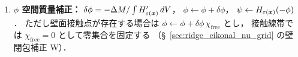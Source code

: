 \begin{tcolorbox}[algbox, title={Ridge--Eikonal 距離再構成の基本手順}]
\begin{enumerate}
        ここで $\varepsilon_\xi$ は §\ref{sec:cls_advection}
        の界面幅係数 $C_\varepsilon$ と同一のスカラー定数
        （$\varepsilon = C_\varepsilon\Delta x_{\min}$ より $\varepsilon_\xi = C_\varepsilon \approx 1.0\sim 2.0$）；
        本節では ξ 計算座標で $\varepsilon_\xi$ 表記を採用し，
        §\ref{sec:cls_advection}/§\ref{sec:intro} と表記体系のみ異なる
        同一物理量を表す．
        一様格子では $\varepsilon(i,j) = \varepsilon$（スカラーに帰着）；
        非一様格子では各セルの物理格子幅に比例した界面幅を実現する．
  \item \textbf{$\phi$ 空間質量補正：}
        $\delta\phi = -\Delta M / \int H'_{\varepsilon(\bm{x})}\,dV$，
        $\phi \leftarrow \phi + \delta\phi$，
        $\psi \leftarrow H_{\varepsilon(\bm{x})}(-\phi)$．
        ただし壁面接触点が存在する場合は
        $\phi \leftarrow \phi+\delta\phi\,\chi_{\mathrm{free}}$ とし，
        接触線帯では $\chi_{\mathrm{free}}=0$ として零集合を固定する
        （§~\ref{sec:ridge_eikonal_nu_grid} の壁閉包補正 W）．
\end{enumerate}
\end{tcolorbox}

